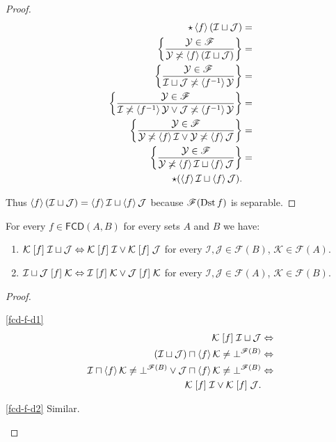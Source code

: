 \begin{proof}
~
\begin{align*}
\star\left\langle f\right\rangle(\mathcal{I}\sqcup\mathcal{J}) & =\\
\left\{ \frac{\mathcal{Y}\in\mathscr{F}}{\mathcal{Y}\not\asymp\left\langle f\right\rangle(\mathcal{I}\sqcup\mathcal{J})}\right\} & =\\
\left\{ \frac{\mathcal{Y}\in\mathscr{F}}{\mathcal{I}\sqcup\mathcal{J}\not\asymp\left\langle 
f^{-1}\right\rangle\mathcal{Y}}\right\} & =\\
\left\{ \frac{\mathcal{Y}\in\mathscr{F}}{\mathcal{I}\not\asymp\left\langle f^{-1}\right\rangle\mathcal{Y}
\lor\mathcal{J}\not\asymp\left\langle f^{-1}\right\rangle\mathcal{Y}}\right\} & =\\
\left\{ \frac{\mathcal{Y}\in\mathscr{F}}{\mathcal{Y}\not\asymp\left\langle f\right\rangle\mathcal{I}\lor\mathcal{Y}\not\asymp\left\langle f\right\rangle\mathcal{J}}\right\} & =\\
\left\{ \frac{\mathcal{Y}\in\mathscr{F}}{\mathcal{Y}\not\asymp\left\langle f\right\rangle\mathcal{I}\sqcup\left\langle f\right\rangle\mathcal{J}}\right\} & =\\
\star(\left\langle f\right\rangle\mathcal{I}\sqcup\left\langle f\right\rangle\mathcal{J}).
\end{align*}


Thus $\left\langle f\right\rangle(\mathcal{I}\sqcup\mathcal{J})=\left\langle f\right\rangle\mathcal{I}\sqcup\left\langle f\right\rangle\mathcal{J}$
because $\mathscr{F}(\operatorname{Dst} f)$ is separable.\end{proof}
\begin{prop}
For every $f\in\mathsf{FCD}(A,B)$ for every sets $A$ and $B$ we
have:
\begin{enumerate}
\item \label{fcd-f-d1}$\mathcal{K}\mathrel{\left[f\right]}\mathcal{I}\sqcup\mathcal{J}\Leftrightarrow\mathcal{K}\mathrel{\left[f\right]}\mathcal{I}\lor\mathcal{K}\mathrel{\left[f\right]}\mathcal{J}$
for every $\mathcal{I},\mathcal{J}\in\mathscr{F}(B)$,
$\mathcal{K}\in\mathscr{F}(A)$.
\item \label{fcd-f-d2}$\mathcal{I}\sqcup\mathcal{J}\mathrel{\left[f\right]}\mathcal{K}\Leftrightarrow\mathcal{I}\mathrel{\left[f\right]}\mathcal{K}\lor\mathcal{J}\mathrel{\left[f\right]}\mathcal{K}$
for every $\mathcal{I},\mathcal{J}\in\mathscr{F}(A)$,
$\mathcal{K}\in\mathscr{F}(B)$.
\end{enumerate}
\end{prop}
\begin{proof}
~
\begin{disorder}
\item [{\ref{fcd-f-d1}}] ~
\begin{align*}
\mathcal{K}\mathrel{\left[f\right]}\mathcal{I}\sqcup\mathcal{J} & \Leftrightarrow\\
(\mathcal{I}\sqcup\mathcal{J})\sqcap\left\langle f\right\rangle\mathcal{K}\ne\bot^{\mathscr{F}(B)}
& \Leftrightarrow\\
\mathcal{I}\sqcap\left\langle f\right\rangle\mathcal{K}\ne\bot^{\mathscr{F}(B)}\lor\mathcal{J}\sqcap\left\langle f\right\rangle\mathcal{K}\ne\bot^{\mathscr{F}(B)} & \Leftrightarrow\\
\mathcal{K}\mathrel{\left[f\right]}\mathcal{I}\lor\mathcal{K}\mathrel{\left[f\right]}\mathcal{J}.
\end{align*}

\item [{\ref{fcd-f-d2}}] Similar.
\end{disorder}
\end{proof}

